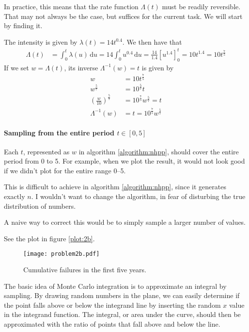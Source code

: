 \documentclass[a4paper,english,12pt]{article}
\begin{document}
In practice, this means that the rate function $\Lambda(t)$ must be readily
reversible. That may not always be the case, but suffices for the current task.
We will start by finding it.

The intensity is given by $\lambda(t) = 14t^{0.4}$. We then have that
\begin{align*}
  \Lambda(t) &= \int_0^t{\lambda(u)}\, \textrm{d}u
    =  14\int_0^t{u^{0.4}}\, \textrm{d}u
    = \frac{14}{1.4}\left[ u^{1.4} \right]_0^t = 10t^{1.4} = 10t^{\frac{7}{5}}
\end{align*}
If we set $w = \Lambda(t)$, its inverse $\Lambda^{-1}(w) = t$ is given by
\begin{align*}
  w &= 10t^{\frac{7}{5}} \\
  w^{\frac{5}{7}} &= 10^{\frac{5}{7}}t \\
      \left( \frac{w}{10} \right)^{\frac{5}{7}} 
      &= 10^{\frac{7}{5}}w^{\frac{5}{7}} = t \\
  \Lambda^{-1}(w) &= t = 10^{\frac{7}{5}}w^{\frac{5}{7}}
\end{align*}

\paragraph{Sampling from the entire period $t \in [0,5]$}
Each $t$, represented as $w$ in algorithm \vref{algorithm:nhpp}, should cover the
entire period from 0 to 5. For example, when we plot the result, it would not
look good if we didn't plot for the entire range 0--5.

This is difficult to achieve in algorithm \vref{algorithm:nhpp}, since it
generates exactly $n$. I wouldn't want to change the algorithm, in fear of
disturbing the true distribution of numbers.

A naive way to correct this would be to simply sample a larger number of
values.

See the plot in figure \vref{plot:2b}.

\begin{figure}
  \centering
  \texttt{[image: problem2b.pdf]}
  \caption{Cumulative failures in the first five years.}
  \label{plot:2b}
\end{figure}


\clearpage
{}
The basic idea of Monte Carlo integration is to approximate an integral by
sampling. By drawing random numbers in the plane, we can easily determine if
the point falls above or below the integrand line by inserting the random $x$
value in the integrand function. The integral, or area under the curve, should
then be approximated with the ratio of points that fall above and below the
line.
\end{document}
